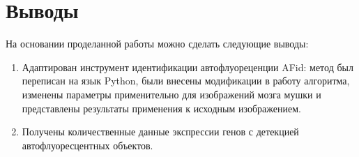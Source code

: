 \chapter{Выводы} \label{ch6}

На основании проделанной работы можно сделать следующие выводы:
\begin{enumerate}[1.]
	\item Адаптирован инструмент идентификации автофлуореценции AFid:  метод был переписан на язык Python, были внесены модификации в работу алгоритма, изменены параметры применительно для изображений мозга мушки и представлены результаты применения к исходным изображением.
	\item Получены количественные данные экспрессии генов с детекцией автофлуоресцентных объектов.
\end{enumerate}








%
